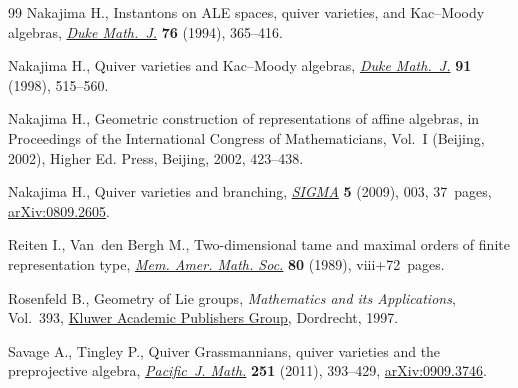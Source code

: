 \documentclass[pdftex]{sigma}%
\numberwithin{equation}{section}
\begin{document}
\begin{thebibliography}{99}
Nakajima H., Instantons on {ALE} spaces, quiver varieties, and {K}ac--{M}oody
 algebras, \href{https://doi.org/10.1215/S0012-7094-94-07613-8}{\textit{Duke Math.~J.}} \textbf{76} (1994), 365--416.

Nakajima H., Quiver varieties and {K}ac--{M}oody algebras, \href{https://doi.org/10.1215/S0012-7094-98-09120-7}{\textit{Duke
 Math.~J.}} \textbf{91} (1998), 515--560.

Nakajima H., Geometric construction of representations of affine algebras, in
 Proceedings of the {I}nternational {C}ongress of {M}athematicians, {V}ol.~{I}
 ({B}eijing, 2002), Higher Ed. Press, Beijing, 2002, 423--438.

Nakajima H., Quiver varieties and branching, \href{https://doi.org/10.3842/SIGMA.2009.003}{\textit{SIGMA}} \textbf{5} (2009),
 003, 37~pages, \href{https://arxiv.org/abs/0809.2605}{arXiv:0809.2605}.

Reiten I., Van~den Bergh M., Two-dimensional tame and maximal orders of finite
 representation type, \href{https://doi.org/10.1090/memo/0408}{\textit{Mem. Amer. Math. Soc.}} \textbf{80} (1989),
 viii+72~pages.

Rosenfeld B., Geometry of {L}ie groups, \textit{Mathematics and its
 Applications}, Vol.~393, \href{https://doi.org/10.1007/978-1-4757-5325-7}{Kluwer Academic Publishers Group}, Dordrecht, 1997.

Savage A., Tingley P., Quiver {G}rassmannians, quiver varieties and the
 preprojective algebra, \href{https://doi.org/10.2140/pjm.2011.251.393}{\textit{Pacific~J. Math.}} \textbf{251} (2011),
 393--429, \href{https://arxiv.org/abs/0909.3746}{arXiv:0909.3746}.

\end{thebibliography}\LastPageEnding
\end{document}
